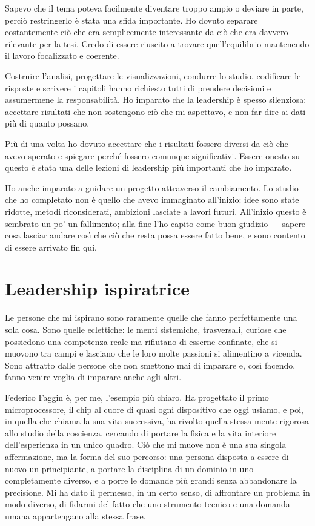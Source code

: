 Sapevo che il tema poteva facilmente diventare troppo ampio o deviare in parte, perciò restringerlo è stata una sfida importante. Ho dovuto separare costantemente ciò che era semplicemente interessante da ciò che era davvero rilevante per la tesi. Credo di essere riuscito a trovare quell'equilibrio mantenendo il lavoro focalizzato e coerente.

Costruire l'analisi, progettare le visualizzazioni, condurre lo studio, codificare le risposte e scrivere i capitoli hanno richiesto tutti di prendere decisioni e assumermene la responsabilità. Ho imparato che la leadership è spesso silenziosa: accettare risultati che non sostengono ciò che mi aspettavo, e non far dire ai dati più di quanto possano.

Più di una volta ho dovuto accettare che i risultati fossero diversi da ciò che avevo sperato e spiegare perché fossero comunque significativi. Essere onesto su questo è stata una delle lezioni di leadership più importanti che ho imparato.

Ho anche imparato a guidare un progetto attraverso il cambiamento. Lo studio che ho completato non è quello che avevo immaginato all'inizio: idee sono state ridotte, metodi riconsiderati, ambizioni lasciate a lavori futuri. All'inizio questo è sembrato un po' un fallimento; alla fine l'ho capito come buon giudizio --- sapere cosa lasciar andare così che ciò che resta possa essere fatto bene, e sono contento di essere arrivato fin qui.


\section{Leadership ispiratrice}
\label{sec:inspiration}

Le persone che mi ispirano sono raramente quelle che fanno perfettamente una sola cosa. Sono quelle eclettiche: le menti sistemiche, trasversali, curiose che possiedono una competenza reale ma rifiutano di esserne confinate, che si muovono tra campi e lasciano che le loro molte passioni si alimentino a vicenda. Sono attratto dalle persone che non smettono mai di imparare e, così facendo, fanno venire voglia di imparare anche agli altri.

Federico Faggin è, per me, l'esempio più chiaro. Ha progettato il primo microprocessore, il chip al cuore di quasi ogni dispositivo che oggi usiamo, e poi, in quella che chiama la sua vita successiva, ha rivolto quella stessa mente rigorosa allo studio della coscienza, cercando di portare la fisica e la vita interiore dell'esperienza in un unico quadro. Ciò che mi muove non è una sua singola affermazione, ma la forma del suo percorso: una persona disposta a essere di nuovo un principiante, a portare la disciplina di un dominio in uno completamente diverso, e a porre le domande più grandi senza abbandonare la precisione. Mi ha dato il permesso, in un certo senso, di affrontare un problema in modo diverso, di fidarmi del fatto che uno strumento tecnico e una domanda umana appartengano alla stessa frase.

